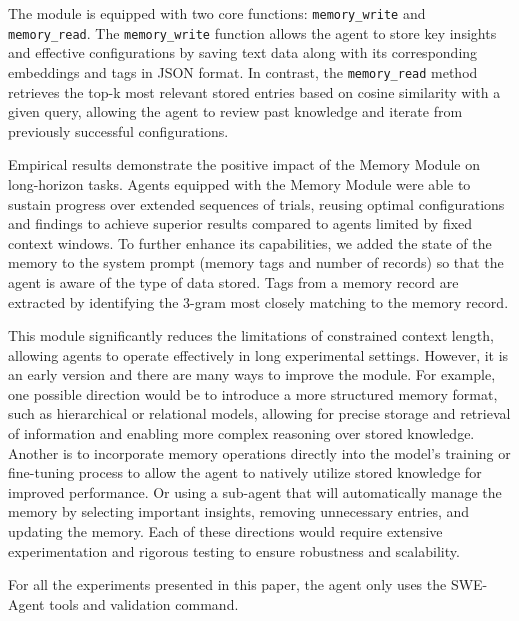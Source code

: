 \documentclass[]{fairmeta}
\begin{document}
The module is equipped with two core functions: \texttt{memory\_write} and \texttt{memory\_read}. The \texttt{memory\_write} function allows the agent to store key insights and effective configurations by saving text data along with its corresponding embeddings and tags in JSON format. In contrast, the \texttt{memory\_read} method retrieves the top-k most relevant stored entries based on cosine similarity with a given query, allowing the agent to review past knowledge and iterate from previously successful configurations.

Empirical results demonstrate the positive impact of the Memory Module on long-horizon tasks. Agents equipped with the Memory Module were able to sustain progress over extended sequences of trials, reusing optimal configurations and findings to achieve superior results compared to agents limited by fixed context windows. To further enhance its capabilities, we added the state of the memory to the system prompt (memory tags and number of records) so that the agent is aware of the type of data stored. Tags from a memory record are extracted by identifying the 3-gram most closely matching to the memory record.

This module significantly reduces the limitations of constrained context length, allowing agents to operate effectively in long experimental settings. However, it is an early version and there are many ways to improve the module. For example, one possible direction would be to introduce a more structured memory format, such as hierarchical or relational models, allowing for precise storage and retrieval of information and enabling more complex reasoning over stored knowledge. Another is to incorporate memory operations directly into the model’s training or fine-tuning process to allow the agent to natively utilize stored knowledge for improved performance. Or using a sub-agent that will automatically manage the memory by selecting important insights, removing unnecessary entries, and updating the memory. Each of these directions would require extensive experimentation and rigorous testing to ensure robustness and scalability.

For all the experiments presented in this paper, the agent only uses the SWE-Agent tools and validation command.



\end{document}
